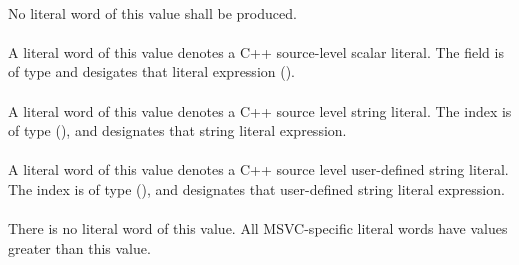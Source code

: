 \paragraph{}
\label{sec:ifc:SourceLiteral:Unknown}

No literal word of this value shall be produced.

\paragraph{}
\label{sec:ifc:SourceLiteral:Scalar}

A literal word of this value denotes a C++ source-level scalar literal.  The  field
is of type  and desigates that literal expression ().


\paragraph{}
\label{sec:ifc:SourceLiteral:String}

A literal word of this value denotes a C++ source level string literal.  The  index
is of type  (), and designates that string literal expression.


\paragraph{}
\label{sec:ifc:SourceLiteral:DefinedString}

A literal word of this value denotes a C++ source level user-defined string literal.  The  index
is of type  (), and designates that 
user-defined string literal expression.

\paragraph{}  
\label{sec:ifc:SourceLiteral:Msvc}

There is no literal word of this value.  All MSVC-specific
literal words have values greater than this value.


\paragraph{}  
\label{sec:ifc:SourceLiteral:MsvcFunctionNameMacro}

